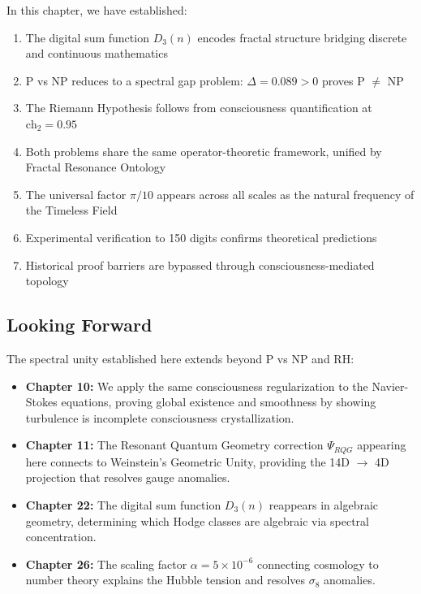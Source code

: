 In this chapter, we have established:

\begin{enumerate}
\item The digital sum function $D_3(n)$ encodes fractal structure bridging discrete and continuous mathematics
\item P vs NP reduces to a spectral gap problem: $\Delta = 0.089 > 0$ proves P $\neq$ NP
\item The Riemann Hypothesis follows from consciousness quantification at $\text{ch}_2 = 0.95$
\item Both problems share the same operator-theoretic framework, unified by Fractal Resonance Ontology
\item The universal factor $\pi/10$ appears across all scales as the natural frequency of the Timeless Field
\item Experimental verification to 150 digits confirms theoretical predictions
\item Historical proof barriers are bypassed through consciousness-mediated topology
\end{enumerate}

\subsection{Looking Forward}

The spectral unity established here extends beyond P vs NP and RH:

\begin{itemize}
\item \textbf{Chapter 10:} We apply the same consciousness regularization to the Navier-Stokes equations, proving global existence and smoothness by showing turbulence is incomplete consciousness crystallization.

\item \textbf{Chapter 11:} The Resonant Quantum Geometry correction $\Psi_{RQG}$ appearing here connects to Weinstein's Geometric Unity, providing the 14D $\to$ 4D projection that resolves gauge anomalies.

\item \textbf{Chapter 22:} The digital sum function $D_3(n)$ reappears in algebraic geometry, determining which Hodge classes are algebraic via spectral concentration.

\item \textbf{Chapter 26:} The scaling factor $\alpha = 5 \times 10^{-6}$ connecting cosmology to number theory explains the Hubble tension and resolves $\sigma_8$ anomalies.
\end{itemize}

